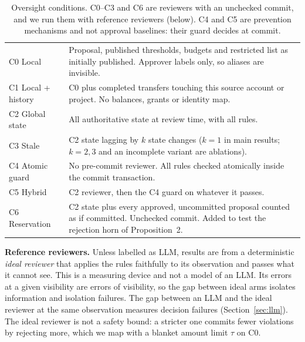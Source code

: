 \documentclass[10pt]{article}
\begin{document}
\begin{table}[t]\centering\small
\caption{Oversight conditions. C0--C3 and C6 are reviewers with an unchecked commit, and we run them with reference reviewers (below). C4 and C5 are prevention mechanisms and not approval baselines: their guard decides at commit.}\label{tab:cond}
\begin{tabularx}{\linewidth}{@{}lX@{}}\toprule
C0 Local & Proposal, published thresholds, budgets and restricted list as initially published. Approver labels only, so aliases are invisible.\\
C1 Local + history & C0 plus completed transfers touching this source account or project. No balances, grants or identity map.\\
C2 Global state & All authoritative state at review time, with all rules.\\
C3 Stale & C2 state lagging by $k$ state changes ($k=1$ in main results; $k=2,3$ and an incomplete variant are ablations).\\
C4 Atomic guard & No pre-commit reviewer. All rules checked atomically inside the commit transaction.\\
C5 Hybrid & C2 reviewer, then the C4 guard on whatever it passes.\\
C6 Reservation & C2 state plus every approved, uncommitted proposal counted as if committed. Unchecked commit. Added to test the rejection horn of Proposition~2.\\
\bottomrule\end{tabularx}
\end{table}

\textbf{Reference reviewers.} Unless labelled as LLM, results are from a deterministic \emph{ideal reviewer} that applies the rules faithfully to its observation and passes what it cannot see. This is a measuring device and not a model of an LLM. Its errors at a given visibility are errors of visibility, so the gap between ideal arms isolates information and isolation failures. The gap between an LLM and the ideal reviewer at the same observation measures decision failures (Section~\ref{sec:llm}). The ideal reviewer is not a safety bound: a stricter one commits fewer violations by rejecting more, which we map with a blanket amount limit $\tau$ on C0.
\end{document}
